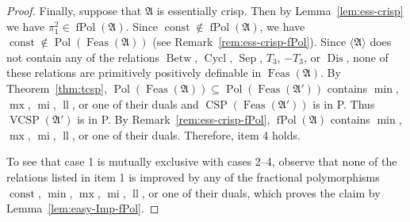\documentclass[preprint,12pt]{elsarticle}
\newcommand{\Q}{\mathbb Q}
\newcommand{\bA}{{\mathfrak A}}
\newcommand{\checked}[1]{#1}
\DeclareMathOperator{\Cyc}{Cycl}
\DeclareMathOperator{\Aut}{Aut}
\DeclareMathOperator{\fPol}{fPol}
\DeclareMathOperator{\VCSP}{VCSP}
\DeclareMathOperator{\CSP}{CSP}
\DeclareMathOperator{\Pol}{Pol}
\DeclareMathOperator{\Feas}{Feas}
\DeclareMathOperator{\Sym}{Sym}
\DeclareMathOperator{\mi}{mi}
\DeclareMathOperator{\lele}{ll}
\DeclareMathOperator{\mx}{mx}
\DeclareMathOperator{\lex}{lex}
\DeclareMathOperator{\inj}{inj}
\DeclareMathOperator{\const}{const}
\DeclareMathOperator{\Betw}{Betw}
\DeclareMathOperator{\Sep}{Sep}
\DeclareMathOperator{\Dis}{Dis}
\begin{document}
\begin{proof}
Finally, suppose that $\bA$ is essentially crisp. Then by Lemma~\ref{lem:ess-crisp} we have $\pi_1^2 \in \fPol(\bA)$. 
Since $\const \not\in \fPol(\bA)$, we have 
$\const \not\in \Pol(\Feas(\bA))$ (see Remark~\ref{rem:ess-crisp-fPol}).
Since $\langle \bA \rangle$ does not contain any of the relations $\Betw$, $\Cyc$, $\Sep$, $T_3$, $-T_3$, or $\Dis$, none of these relations are primitively positively definable in 
$\Feas(\bA)$.
By Theorem~\ref{thm:tcsp}, $\Pol(\Feas(\bA)) \subseteq \Pol(\Feas(\bA'))$ contains $\min$, $\mx$, $\mi$, $\lele$, or one of their duals and $\CSP(\Feas(\bA'))$ is in P. 
Thus $\VCSP(\bA')$ is in P. By Remark~\ref{rem:ess-crisp-fPol}, $\fPol(\bA)$ contains  $\min$, $\mx$, $\mi$, $\lele$, or one of their duals. Therefore, item 4 holds.

\checked{To see that case 1 is mutually exclusive with cases 2--4, observe that none of the relations listed in item 1 is improved by any of the fractional polymorphisms $\const$, $\min$, $\mx$, $\mi$, $\lele$, or one of their duals, which proves the claim by Lemma~\ref{lem:easy-Imp-fPol}.}
\end{proof}


\end{document}
